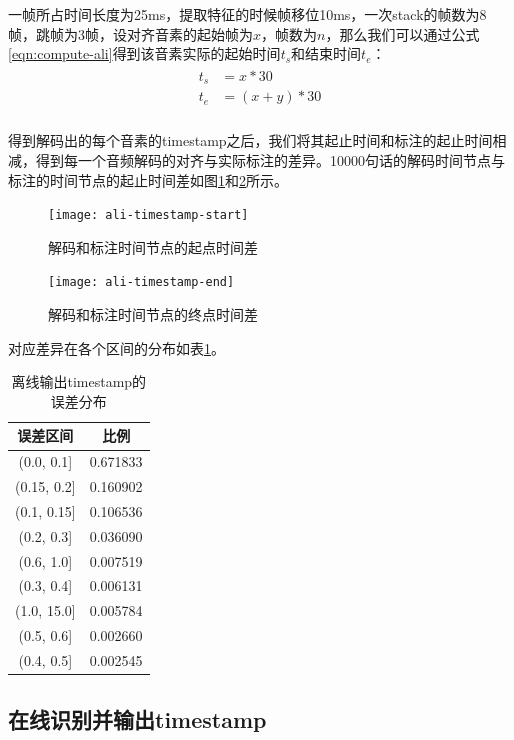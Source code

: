 一帧所占时间长度为25ms，提取特征的时候帧移位10ms，一次stack的帧数为8帧，跳帧为3帧，设对齐音素的起始帧为$x$，帧数为$n$，那么我们可以通过公式\ref{eqn:compute-ali}得到该音素实际的起始时间$t_{s}$和结束时间$t_{e}$：
\begin{align}
\begin{split}
\label{eqn:compute-ali}
	t_{s} &= x*30 \\
	t_{e} &= (x+y)*30 \\
\end{split}
\end{align}

得到解码出的每个音素的timestamp之后，我们将其起止时间和标注的起止时间相减，得到每一个音频解码的对齐与实际标注的差异。10000句话的解码时间节点与标注的时间节点的起止时间差如图\ref{fig:ali-sta}和\ref{fig:ali-end}所示。
\begin{figure}[!ht]
	\centering
	\texttt{[image: ali-timestamp-start]}
	\caption{解码和标注时间节点的起点时间差}
\label{fig:ali-sta}
\end{figure}

\begin{figure}[!ht]
	\centering
	\texttt{[image: ali-timestamp-end]}
	\caption{解码和标注时间节点的终点时间差}
\label{fig:ali-end}
\end{figure}

对应差异在各个区间的分布如表\ref{tab:offline-dis}。

\begin{table}[h]
 \centering
 \caption{离线输出timestamp的误差分布}
	 \begin{tabular*}{1\textwidth}{@{\extracolsep{\fill}}cc}
	 \toprule
		{\bf 误差区间} & {\bf 比例} \\
	 \midrule
		(0.0, 0.1]   &  0.671833 \\
		(0.15, 0.2]  &  0.160902 \\
		(0.1, 0.15]  &  0.106536 \\
		(0.2, 0.3]   &  0.036090 \\
		(0.6, 1.0]   &  0.007519 \\
		(0.3, 0.4]   &  0.006131 \\
		(1.0, 15.0]  &  0.005784 \\
		(0.5, 0.6]   &  0.002660 \\
		(0.4, 0.5]   &  0.002545 \\
	 \bottomrule
	 \end{tabular*}%
 \label{tab:offline-dis}%
\end{table}%

\subsection{在线识别并输出timestamp}